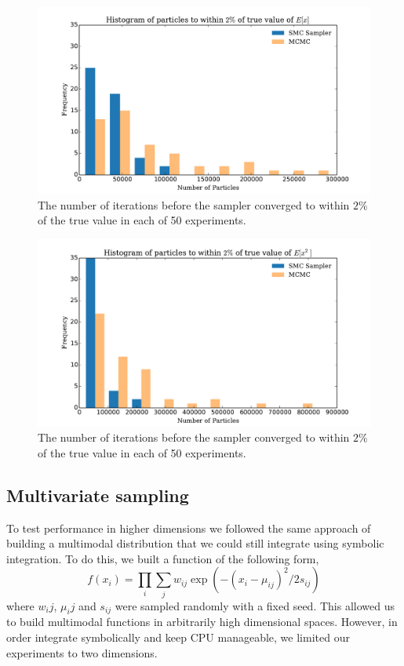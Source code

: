 \documentclass[12pt]{elsarticle}
\begin{document}
\begin{figure}[htbp]
\begin{center}
\includegraphics[width = \textwidth]{plots/iterations.pdf}
\caption{The number of iterations before the sampler converged to within $2\%$ of the true value in each of 50 experiments.}
\label{fig:itersEX}
\end{center}
\end{figure}

\begin{figure}[htbp]
\begin{center}
\includegraphics[width = \textwidth]{plots/iterationsEx2.pdf}
\caption{The number of iterations before the sampler converged to within $2\%$ of the true value in each of 50 experiments.}
\label{fig:itersEX2}
\end{center}
\end{figure}

\subsection*{Multivariate sampling}
To test performance in higher dimensions we followed the same approach of building a multimodal distribution that we could still integrate using symbolic integration. To do this, we built a function of the following form,
\[
f(x_i) = \prod_i \sum_j w_{ij} \exp(-(x_i - \mu_{ij})^2/2s_{ij})
\]
where $w_ij$, $\mu_ij$ and $s_{ij}$ were sampled randomly with a fixed seed. This allowed us to build multimodal functions in arbitrarily high dimensional spaces. However, in order integrate symbolically and keep CPU manageable, we limited our experiments to two dimensions. 
\end{document}
